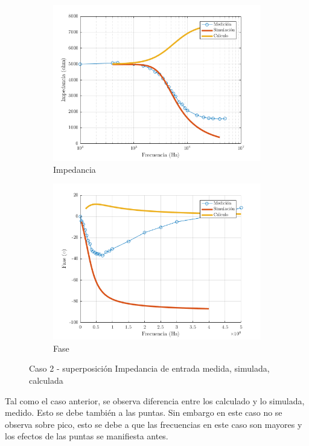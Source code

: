 \documentclass[../../main.tex]{subfiles}
\begin{document}
\begin{figure}[H]
\centering
\begin{subfigure}[http]{0.49\textwidth}
\includegraphics[width=\textwidth]{imagenes/z_inv_r_c2.png}
\caption{Impedancia}\label{fig=zInvZc2}
\end{subfigure}
\begin{subfigure}[http]{0.49\textwidth}
\includegraphics[width=\textwidth]{imagenes/z_inv_f_c2.png}
\caption{Fase} \label{fig=zInvFc2}
\end{subfigure}
\caption{Caso 2 - superposición Impedancia de entrada  medida, simulada, calculada}
\end{figure}

Tal como el caso anterior, se observa diferencia entre los calculado y lo simulada, medido. Esto se debe también a las puntas. Sin embargo en este caso no se observa sobre pico, esto se debe a que las frecuencias en este caso son mayores y los efectos de las puntas se manifiesta antes.
\end{document}
